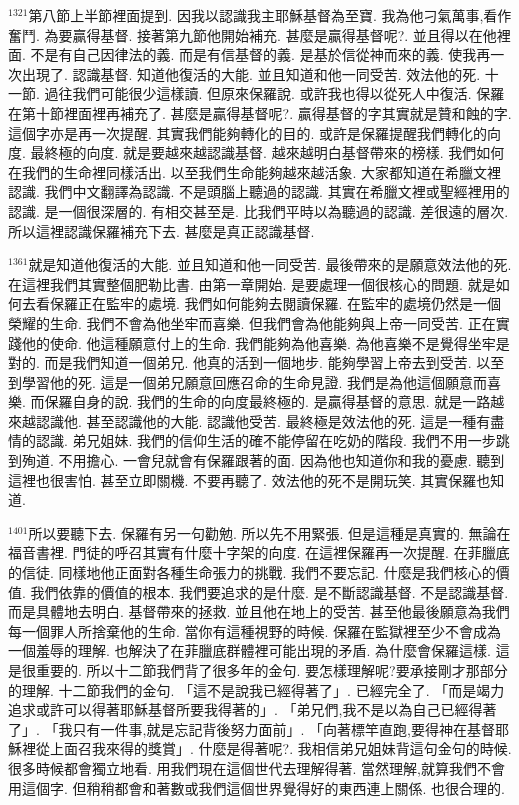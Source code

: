 \documentclass{book}
\begin{document}
$^{1321}$第八節上半節裡面提到.
因我以認識我主耶穌基督為至寶.
我為他刁氣萬事,看作奮鬥.
為要贏得基督.
接著第九節他開始補充.
甚麼是贏得基督呢?.
並且得以在他裡面.
不是有自己因律法的義.
而是有信基督的義.
是基於信從神而來的義.
使我再一次出現了.
認識基督.
知道他復活的大能.
並且知道和他一同受苦.
效法他的死.
十一節.
過往我們可能很少這樣讀.
但原來保羅說.
或許我也得以從死人中復活.
保羅在第十節裡面裡再補充了.
甚麼是贏得基督呢?.
贏得基督的字其實就是贊和蝕的字.
這個字亦是再一次提醒.
其實我們能夠轉化的目的.
或許是保羅提醒我們轉化的向度.
最終極的向度.
就是要越來越認識基督.
越來越明白基督帶來的榜樣.
我們如何在我們的生命裡同樣活出.
以至我們生命能夠越來越活象.
大家都知道在希臘文裡認識.
我們中文翻譯為認識.
不是頭腦上聽過的認識.
其實在希臘文裡或聖經裡用的認識.
是一個很深層的.
有相交甚至是.
比我們平時以為聽過的認識.
差很遠的層次.
所以這裡認識保羅補充下去.
甚麼是真正認識基督.

$^{1361}$就是知道他復活的大能.
並且知道和他一同受苦.
最後帶來的是願意效法他的死.
在這裡我們其實整個肥勒比書.
由第一章開始.
是要處理一個很核心的問題.
就是如何去看保羅正在監牢的處境.
我們如何能夠去閱讀保羅.
在監牢的處境仍然是一個榮耀的生命.
我們不會為他坐牢而喜樂.
但我們會為他能夠與上帝一同受苦.
正在實踐他的使命.
他這種願意付上的生命.
我們能夠為他喜樂.
為他喜樂不是覺得坐牢是對的.
而是我們知道一個弟兄.
他真的活到一個地步.
能夠學習上帝去到受苦.
以至到學習他的死.
這是一個弟兄願意回應召命的生命見證.
我們是為他這個願意而喜樂.
而保羅自身的說.
我們的生命的向度最終極的.
是贏得基督的意思.
就是一路越來越認識他.
甚至認識他的大能.
認識他受苦.
最終極是效法他的死.
這是一種有盡情的認識.
弟兄姐妹.
我們的信仰生活的確不能停留在吃奶的階段.
我們不用一步跳到殉道.
不用擔心.
一會兒就會有保羅跟著的面.
因為他也知道你和我的憂慮.
聽到這裡也很害怕.
甚至立即關機.
不要再聽了.
效法他的死不是開玩笑.
其實保羅也知道.

$^{1401}$所以要聽下去.
保羅有另一句勸勉.
所以先不用緊張.
但是這種是真實的.
無論在福音書裡.
門徒的呼召其實有什麼十字架的向度.
在這裡保羅再一次提醒.
在菲臘底的信徒.
同樣地他正面對各種生命張力的挑戰.
我們不要忘記.
什麼是我們核心的價值.
我們依靠的價值的根本.
我們要追求的是什麼.
是不斷認識基督.
不是認識基督.
而是具體地去明白.
基督帶來的拯救.
並且他在地上的受苦.
甚至他最後願意為我們每一個罪人所捨棄他的生命.
當你有這種視野的時候.
保羅在監獄裡至少不會成為一個羞辱的理解.
也解決了在菲臘底群體裡可能出現的矛盾.
為什麼會保羅這樣.
這是很重要的.
所以十二節我們背了很多年的金句.
要怎樣理解呢?要承接剛才那部分的理解.
十二節我們的金句.
「這不是說我已經得著了」.
已經完全了.
「而是竭力追求或許可以得著耶穌基督所要我得著的」.
「弟兄們,我不是以為自己已經得著了」.
「我只有一件事,就是忘記背後努力面前」.
「向著標竿直跑,要得神在基督耶穌裡從上面召我來得的獎賞」.
什麼是得著呢?.
我相信弟兄姐妹背這句金句的時候.
很多時候都會獨立地看.
用我們現在這個世代去理解得著.
當然理解,就算我們不會用這個字.
但稍稍都會和著數或我們這個世界覺得好的東西連上關係.
也很合理的.
\end{document}
